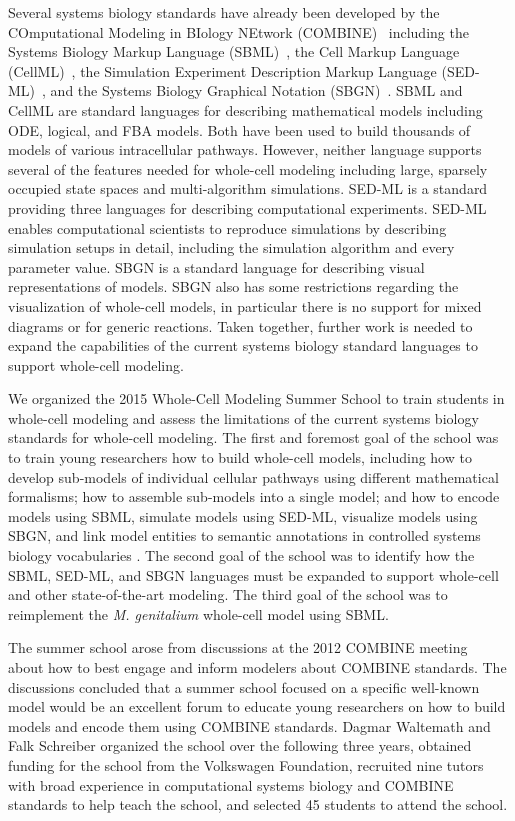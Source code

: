 \documentclass[journal,transmag]{IEEEtran}
\begin{document}
Several systems biology standards have already been developed by the COmputational Modeling in BIology NEtwork (COMBINE)~\cite{le2011meeting} including the Systems Biology Markup Language (SBML)~\cite{hucka2003}, the Cell Markup Language (CellML)~\cite{hedley_2001b}, the Simulation Experiment Description Markup Language (SED-ML)~\cite{sedml2011}, and the Systems Biology Graphical Notation (SBGN)~\cite{LeNovereHMMSS09}. SBML and CellML are standard languages for describing mathematical models including ODE, logical, and FBA models. Both have been used to build thousands of models of various intracellular pathways. 
However, neither language supports several of the features needed for whole-cell modeling including large, sparsely occupied state spaces and multi-algorithm simulations. 
SED-ML is a standard providing three languages for describing computational experiments. SED-ML enables computational scientists to reproduce simulations by describing simulation setups in detail, including the simulation algorithm and every parameter value. 
SBGN is a standard language for describing visual representations of models. SBGN also has some restrictions regarding the visualization of whole-cell models, in particular there is no support for mixed diagrams or for generic reactions.
Taken together, further work is needed to expand the capabilities of the current systems biology standard languages to support whole-cell modeling.

We organized the 2015 Whole-Cell Modeling Summer School to train students in whole-cell modeling and assess the limitations of the current systems biology standards for whole-cell modeling. 
The first and foremost goal of the school was to train young researchers how to build whole-cell models, including how to develop sub-models of individual cellular pathways using different mathematical formalisms; how to assemble sub-models into a single model; and how to encode models using SBML, simulate models using SED-ML, visualize models using SBGN, and link model entities to semantic annotations in controlled systems biology vocabularies \cite{courtot2011a}. 
The second goal of the school was to identify how the SBML, SED-ML, and SBGN languages must be expanded to support whole-cell and other state-of-the-art modeling.
The third goal of the school was to reimplement the \textit{M. genitalium} whole-cell model using SBML.

The summer school arose from discussions at the 2012 COMBINE meeting~\cite{COMBINE2012} about how to best engage and inform modelers about COMBINE standards. The discussions concluded that a summer school focused on a specific well-known model would be an excellent forum to educate young researchers on how to build models and encode them using COMBINE standards. Dagmar Waltemath and Falk Schreiber organized the school over the following three years, obtained funding for the school from the Volkswagen Foundation, recruited nine tutors with broad experience in computational systems biology and COMBINE standards to help teach the school, and selected 45 students to attend the school.
\end{document}

